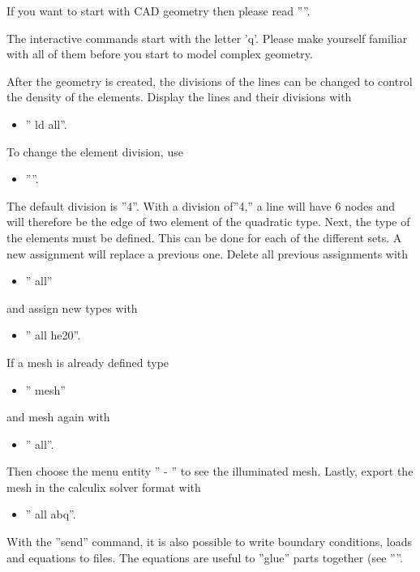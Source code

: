 \documentclass{article}
\begin{document}
If you want to start with CAD geometry then please read ''''.

The interactive commands start with the letter 'q'. Please make yourself familiar with all of them before you start to model complex geometry.

After the geometry is created, the divisions of the lines can be changed to control the density of the elements.  Display the lines and their divisions with 
\begin{itemize}
\item '' ld all''.
\end{itemize}
To change the element division, use 
\begin{itemize}
\item ''''.
\end{itemize}
The default division is ''4''. With a division of''4,'' a line will have 6 nodes and will therefore be the edge of two element of the quadratic type. Next, the type of the elements must be defined. This can be done for each of the different sets. A new assignment will replace a previous one. Delete all previous assignments with
\begin{itemize}
\item '' all''
\end{itemize}
and assign new types with
\begin{itemize}
\item '' all he20''.
\end{itemize}
If a mesh is already defined type
\begin{itemize}
\item '' mesh''
\end{itemize}
and mesh again with
\begin{itemize}
\item '' all''.
\end{itemize}
Then choose the menu entity '' - '' to see the illuminated mesh. Lastly, export the mesh in the calculix solver format with
\begin{itemize}
\item '' all abq''.
\end{itemize}
With the ''send'' command, it is also possible to write boundary conditions, loads and equations to files. The equations are useful to ''glue'' parts together (see ''''.
\end{document}
